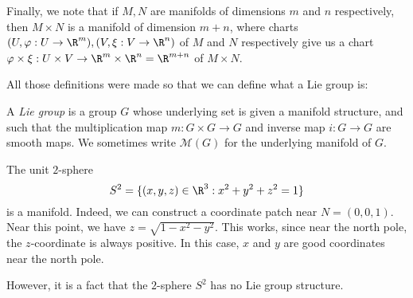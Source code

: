 \documentclass[a4paper]{article}
\begin{document}
\begin{defi}
\begin{center}
  \end{center}
\end{defi}

Finally, we note that if $M, N$ are manifolds of dimensions $m$ and $n$ respectively, then $M \times N$ is a manifold of dimension $m + n$, where charts $(U, \varphi: U \to \R^m), (V, \xi: V \to \R^n)$ of $M$ and $N$ respectively give us a chart $\varphi \times \xi: U \times V \to \R^m \times \R^n = \R^{m + n}$ of $M \times N$.

All those definitions were made so that we can define what a Lie group is:

\begin{defi}
  A \emph{Lie group} is a group $G$ whose underlying set is given a manifold structure, and such that the multiplication map $m: G \times G \to G$ and inverse map $i: G \to G$ are smooth maps. We sometimes write $\mathcal{M}(G)$ for the underlying manifold of $G$.
\end{defi}

\begin{eg}
  The unit $2$-sphere
  \[
    S^2 = \{(x, y, z) \in \R^3: x^2 + y^2 + z^2 = 1\}
  \]
  is a manifold. Indeed, we can construct a coordinate patch near $N = (0, 0, 1)$. Near this point, we have $z = \sqrt{1 - x^2 - y^2}$. This works, since near the north pole, the $z$-coordinate is always positive. In this case, $x$ and $y$ are good coordinates near the north pole.

  However, it is a fact that the $2$-sphere $S^2$ has no Lie group structure.
\end{eg}
\end{document}
